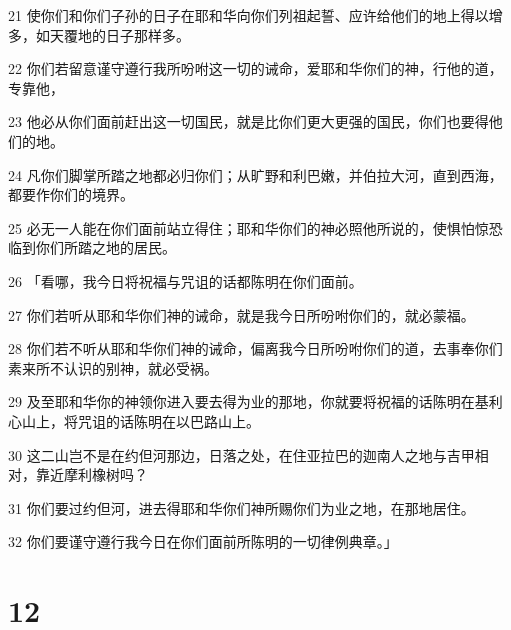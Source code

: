 \par 21 使你们和你们子孙的日子在耶和华向你们列祖起誓、应许给他们的地上得以增多，如天覆地的日子那样多。
\par 22 你们若留意谨守遵行我所吩咐这一切的诫命，爱耶和华你们的神，行他的道，专靠他，
\par 23 他必从你们面前赶出这一切国民，就是比你们更大更强的国民，你们也要得他们的地。
\par 24 凡你们脚掌所踏之地都必归你们；从旷野和利巴嫩，并伯拉大河，直到西海，都要作你们的境界。
\par 25 必无一人能在你们面前站立得住；耶和华你们的神必照他所说的，使惧怕惊恐临到你们所踏之地的居民。
\par 26 「看哪，我今日将祝福与咒诅的话都陈明在你们面前。
\par 27 你们若听从耶和华你们神的诫命，就是我今日所吩咐你们的，就必蒙福。
\par 28 你们若不听从耶和华你们神的诫命，偏离我今日所吩咐你们的道，去事奉你们素来所不认识的别神，就必受祸。
\par 29 及至耶和华你的神领你进入要去得为业的那地，你就要将祝福的话陈明在基利心山上，将咒诅的话陈明在以巴路山上。
\par 30 这二山岂不是在约但河那边，日落之处，在住亚拉巴的迦南人之地与吉甲相对，靠近摩利橡树吗？
\par 31 你们要过约但河，进去得耶和华你们神所赐你们为业之地，在那地居住。
\par 32 你们要谨守遵行我今日在你们面前所陈明的一切律例典章。」

\chapter{12}

